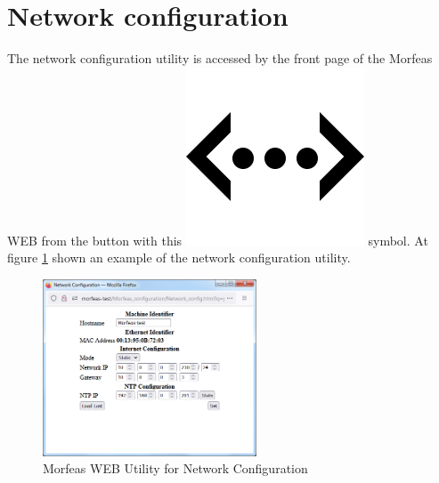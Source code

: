 \section{Network configuration}
The network configuration utility is accessed by the front page of the Morfeas WEB from the button with 
this \includegraphics[height=.125in]{../art/eth.png} symbol.
At figure \ref{fig:net_conf} shown an example of the network configuration utility.
\begin{figure}[h]
\centering
	\includegraphics[width=2.5in,angle=0]{../art/Morfeas_web_if/network_config.png}
	\caption{Morfeas WEB Utility for Network Configuration}
	\label{fig:net_conf}
\end{figure}
